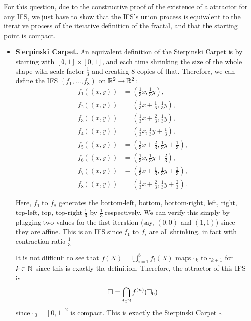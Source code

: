 For this question, due to the constructive proof of the existence of a attractor for any IFS, we just have to show that the IFS's union process is equivalent to the iterative process of the iterative definition of the fractal, and that the starting point is compact.

\begin{itemize}
    \item \textbf{Sierpinski Carpet.} An equivalent definition of the Sierpinski Carpet is by starting with \([0, 1] \times [0, 1]\), and each time shrinking the size of the whole shape with scale factor \(\frac{1}{3}\) and creating 8 copies of that. Therefore, we can define the IFS \((f_1, \ldots, f_8)\) on \(\mathbb{R}^2 \to \mathbb{R}^2\):
    \begin{align*}
        f_1((x, y)) &= \left(\frac{1}{3}x, \frac{1}{3}y\right),\\
        f_2((x, y)) &= \left(\frac{1}{3}x + \frac{1}{3}, \frac{1}{3}y\right),\\
        f_3((x, y)) &= \left(\frac{1}{3}x + \frac{2}{3}, \frac{1}{3}y\right),\\
        f_4((x, y)) &= \left(\frac{1}{3}x, \frac{1}{3}y + \frac{1}{3}\right),\\
        f_5((x, y)) &= \left(\frac{1}{3}x + \frac{2}{3}, \frac{1}{3}y + \frac{1}{3}\right),\\
        f_6((x, y)) &= \left(\frac{1}{3}x, \frac{1}{3}y + \frac{2}{3}\right),\\
        f_7((x, y)) &= \left(\frac{1}{3}x + \frac{1}{3}, \frac{1}{3}y  + \frac{2}{3}\right),\\
        f_8((x, y)) &= \left(\frac{1}{3}x + \frac{2}{3}, \frac{1}{3}y  + \frac{2}{3}\right).
    \end{align*}

    Here, \(f_1\) to \(f_8\) generates the bottom-left, bottom, bottom-right, left, right, top-left, top, top-right \(\frac{1}{3}\) by \(\frac{1}{3}\) respectively. We can verify this simply by plugging two values for the first iteration (say, \((0, 0)\) and \((1, 0)\)) since they are affine. This is an IFS since \(f_1\) to \(f_8\) are all shrinking, in fact with contraction ratio \(\frac{1}{3}\)
    
    It is not difficult to see that \(f(X) = \bigcup_{i = 1}^{8} f_i(X)\) maps \(\square_k\) to \(\square_{k + 1}\) for \(k \in \mathbb{N}\) since this is exactly the definition. Therefore, the attractor of this IFS is
    \[
        \square = \bigcap_{i \in \mathbb{N}} f^{(n)}(\square_0)
    \]
    since \(\square_0 = [0, 1]^2\) is compact. This is exactly the Sierpinski Carpet \(\square\).


\end{itemize}
